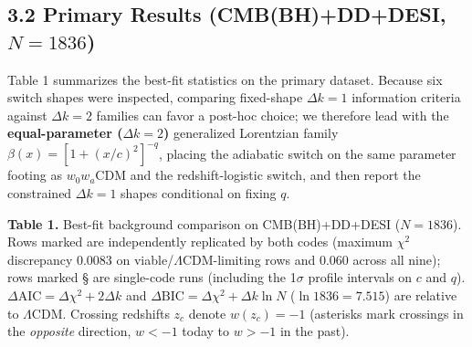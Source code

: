 \documentclass[11pt,a4paper]{article}
\begin{document}
\subsection*{3.2 Primary Results (CMB(BH)+DD+DESI, $N = 1836$)}
Table 1 summarizes the best-fit statistics on the primary dataset. Because six switch shapes were inspected, comparing fixed-shape $\Delta k = 1$ information criteria against $\Delta k = 2$ families can favor a post-hoc choice; we therefore lead with the {\bfseries\boldmath equal-parameter ($\Delta k = 2$)} generalized Lorentzian family $\beta(x) = [1 + (x/c)^2]^{-q}$, placing the adiabatic switch on the same parameter footing as $w_0 w_a$CDM and the redshift-logistic switch, and then report the constrained $\Delta k = 1$ shapes conditional on fixing $q$.

{\bfseries\boldmath Table 1.} Best-fit background comparison on CMB(BH)+DD+DESI ($N = 1836$). Rows marked \dag{} are independently replicated by both codes (maximum $\chi^2$ discrepancy $0.0083$ on viable/$\Lambda$CDM-limiting rows and $0.060$ across all nine); rows marked \S{} are single-code runs (including the 1$\sigma$ profile intervals on $c$ and $q$). $\Delta\text{AIC} = \Delta\chi^2 + 2\Delta k$ and $\Delta\text{BIC} = \Delta\chi^2 + \Delta k \ln N$ ($\ln 1836 = 7.515$) are relative to $\Lambda$CDM. Crossing redshifts $z_c$ denote $w(z_c) = -1$ (asterisks mark crossings in the \emph{opposite} direction, $w < -1$ today to $w > -1$ in the past).
\end{document}
